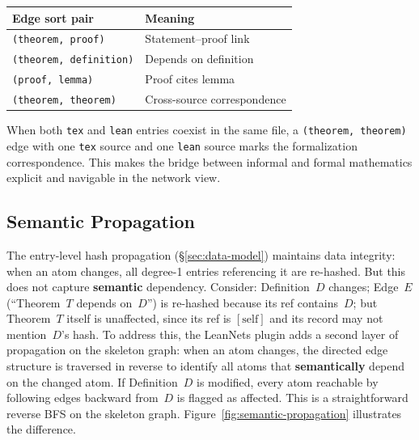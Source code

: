 \begin{table}[H]
\centering
\begin{tabular}{ll}
\toprule
Edge sort pair & Meaning \\
\midrule
\texttt{(theorem, proof)} & Statement--proof link \\
\texttt{(theorem, definition)} & Depends on definition \\
\texttt{(proof, lemma)} & Proof cites lemma \\
\texttt{(theorem, theorem)} & Cross-source correspondence \\
\bottomrule
\end{tabular}
\end{table}

When both \texttt{tex} and \texttt{lean} entries coexist in the same file, a \texttt{(theorem, theorem)} edge with one \texttt{tex} source and one \texttt{lean} source marks the formalization correspondence. This makes the bridge between informal and formal mathematics explicit and navigable in the network view.

\subsection{Semantic Propagation}
The entry-level hash propagation (\S\ref{sec:data-model}) maintains data integrity: when an atom changes, all degree-1 entries referencing it are re-hashed. But this does not capture \textbf{semantic} dependency. Consider: Definition~$D$ changes; Edge~$E$ (``Theorem~$T$ depends on~$D$'') is re-hashed because its ref contains~$D$; but Theorem~$T$ itself is unaffected, since its ref is $[\text{self}]$ and its record may not mention~$D$'s hash. To address this, the LeanNets plugin adds a second layer of propagation on the skeleton graph: when an atom changes, the directed edge structure is traversed in reverse to identify all atoms that \textbf{semantically} depend on the changed atom. If Definition~$D$ is modified, every atom reachable by following edges backward from~$D$ is flagged as affected. This is a straightforward reverse BFS on the skeleton graph. Figure~\ref{fig:semantic-propagation} illustrates the difference.


